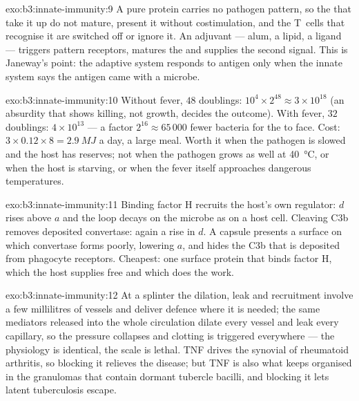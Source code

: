 \begin{solution}{exo:b3:innate-immunity:9}
A pure protein carries no pathogen pattern, so the  that
take it up do not mature, present it without costimulation, and the
T~cells that recognise it are switched off or ignore it. An adjuvant
--- alum, a lipid, a  ligand --- triggers pattern
receptors, matures the  and supplies the second signal.
This is Janeway's point: the adaptive system responds to antigen only
when the innate system says the antigen came with a microbe.
\end{solution}

\begin{solution}{exo:b3:innate-immunity:10}
Without fever, $48$ doublings: $10^{4}\times 2^{48} \approx 3\times
10^{18}$ (an absurdity that shows killing, not growth, decides the
outcome). With fever, $32$ doublings: $4\times 10^{13}$ --- a factor
$2^{16} \approx 65\,000$ fewer bacteria for the  to face.
Cost: $3\times 0.12\times 8 = \qty{2.9}{MJ}$ a day, a large meal. Worth
it when the pathogen is slowed and the host has reserves; not when
the pathogen grows as well at \qty{40}{\celsius}, or when the host is
starving, or when the fever itself approaches dangerous temperatures.
\end{solution}

\begin{solution}{exo:b3:innate-immunity:11}
Binding factor H recruits the host's own regulator: $d$ rises above
$a$ and the loop decays on the microbe as on a host cell. Cleaving
C3b removes deposited convertase: again a rise in $d$. A capsule
presents a surface on which convertase forms poorly, lowering $a$, and
hides the C3b that is deposited from phagocyte receptors. Cheapest:
one surface protein that binds factor H, which the host supplies free
and which does the work.
\end{solution}

\begin{solution}{exo:b3:innate-immunity:12}
At a splinter the dilation, leak and recruitment involve a few
millilitres of vessels and deliver defence where it is needed; the same
mediators released into the whole circulation dilate every vessel and
leak every capillary, so the pressure collapses and clotting is
triggered everywhere --- the physiology is identical, the scale is
lethal. TNF drives the synovial  of rheumatoid arthritis,
so blocking it relieves the disease; but TNF is also what keeps
 organised in the granulomas that contain dormant tubercle
bacilli, and blocking it lets latent tuberculosis escape.
\end{solution}

